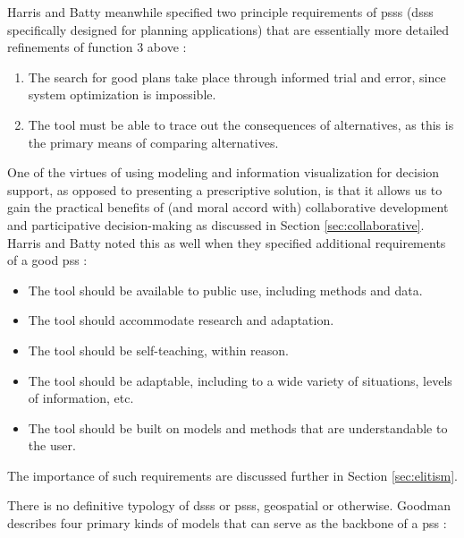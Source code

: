 Harris and Batty meanwhile specified two principle requirements of \acp{pss} (\acp{dss} specifically designed for planning applications) that are essentially more detailed refinements of function 3 above \cite{harrisLocationalModelsGeographic1993}:
\begin{enumerate}[itemsep=0pt,parsep=0pt]
	\item{The search for good plans take place through informed trial and error, since system optimization is impossible.}
	\item{The tool must be able to trace out the consequences of alternatives, as this is the primary means of comparing alternatives.}
\end{enumerate}

One of the virtues of using modeling and information visualization for decision support, as opposed to presenting a prescriptive solution, is that it allows us to gain the practical benefits of (and moral accord with) collaborative development and participative decision-making as discussed in Section \ref{sec:collaborative}. Harris and Batty noted this as well when they specified additional requirements of a good \ac{pss} \cite{harrisLocationalModelsGeographic1993}:

\begin{itemize}[itemsep=0pt,parsep=0pt]
	\item{The tool should be available to public use, including methods and data.}
	\item{The tool should accommodate research and adaptation.}
	\item{The tool should be self-teaching, within reason.}
	\item{The tool should be adaptable, including to a wide variety of situations, levels of information, etc.}
	\item{The tool should be built on models and methods that are understandable to the user.}
\end{itemize}

The importance of such requirements are discussed further in Section \ref{sec:elitism}.

There is no definitive typology of \acp{dss} or \acp{pss}, geospatial or otherwise. Goodman describes four primary kinds of models that can serve as the backbone of a \ac{pss} \cite{goodspeedScenarioPlanningCities2020}: 

